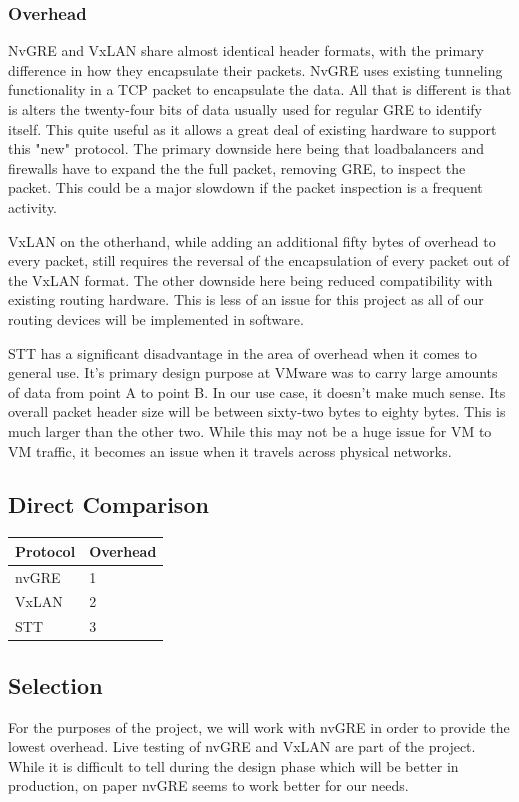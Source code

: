 \documentclass[10pt,letterpaper,onecolumn,draftclsnofoot]{IEEEtran}
\begin{document}
\subsubsection{Overhead}
NvGRE and VxLAN share almost identical header formats, with the primary
difference in how they encapsulate their packets. NvGRE uses existing tunneling
functionality in a TCP packet to encapsulate the data. All that is different is
that is alters the twenty-four bits of data usually used for regular GRE to
identify itself. This quite useful as it allows a great deal of existing
hardware to support this "new" protocol. The primary downside here being that
loadbalancers and firewalls have to expand the the full packet, removing GRE, to
inspect the packet. This could be a major slowdown if the packet inspection is a
frequent activity.\cite{nvgre-vs-vxlan}

VxLAN on the otherhand, while adding an additional fifty bytes of overhead to
every packet, still requires the reversal of the encapsulation of every packet
out of the VxLAN format. The other downside here being reduced compatibility
with existing routing hardware. This is less of an issue for this project as all
of our routing devices will be implemented in software.\cite{nvgre-vs-vxlan}

STT has a significant disadvantage in the area of overhead when it comes to
general use. It's primary design purpose at VMware was to carry large amounts of
data from point A to point B. In our use case, it doesn't make much sense. Its
overall packet header size will be between sixty-two bytes to eighty bytes. This
is much larger than the other two. While this may not be a huge issue for VM to
VM traffic, it becomes an issue when it travels across physical networks.
\cite{stt}

\subsection{Direct Comparison}
\begin{center}
	\begin{tabular}{| l | l |}
		\hline
		Protocol & Overhead \\ \hline
		nvGRE & 1 \\ \hline
		VxLAN & 2 \\ \hline
		STT & 3 \\ \hline
	\end{tabular}
\end{center}

\subsection{Selection}
For the purposes of the project, we will work with nvGRE in order to provide the
lowest overhead. Live testing of nvGRE and VxLAN are part of the project. While
it is difficult to tell during the design phase which will be better in
production, on paper nvGRE seems to work better for our needs.
\end{document}
